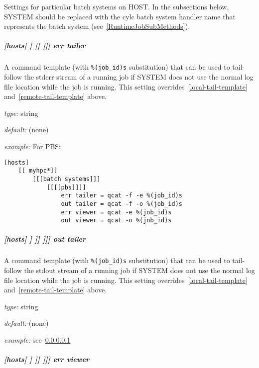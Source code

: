 Settings for particular batch systems on HOST. In the subsections below, SYSTEM
should be replaced with the cylc batch system handler name that represents the
batch system (see~\ref{RuntimeJobSubMethods}).

\subparagraph[{[[[[}SYSTEM{]]]]}err tailer]{[hosts] \textrightarrow [[HOST]] \textrightarrow [[[batch systems]]] \textrightarrow [[[[SYSTEM]]]] \textrightarrow err tailer}
\label{err-tailer}

A command template (with \lstinline=%(job_id)s= substitution) that can be used
to tail-follow the stderr stream of a running job if SYSTEM does
not use the normal log file location while the job is running.  This setting
overrides~\ref{local-tail-template} and~\ref{remote-tail-template} above.

\begin{myitemize}
\item {\em type:} string
\item {\em default:} (none)
\item {\em example:} For PBS:
    \begin{lstlisting}
[hosts]
    [[ myhpc*]]
        [[[batch systems]]]
            [[[[pbs]]]]
                err tailer = qcat -f -e %(job_id)s
                out tailer = qcat -f -o %(job_id)s
                err viewer = qcat -e %(job_id)s
                out viewer = qcat -o %(job_id)s
    \end{lstlisting}
\end{myitemize}

\subparagraph[{[[[[}SYSTEM{]]]]}out tailer]{[hosts] \textrightarrow [[HOST]] \textrightarrow [[[batch systems]]] \textrightarrow [[[[SYSTEM]]]] \textrightarrow out tailer}
\label{out-tailer}

A command template (with \lstinline=%(job_id)s= substitution) that can be used
to tail-follow the stdout stream of a running job if SYSTEM does
not use the normal log file location while the job is running.  This setting
overrides~\ref{local-tail-template} and~\ref{remote-tail-template} above.

\begin{myitemize}
\item {\em type:} string
\item {\em default:} (none)
\item {\em example:} see~\ref{err-tailer}
\end{myitemize}

\subparagraph[{[[[[}SYSTEM{]]]]}err viewer]{[hosts] \textrightarrow [[HOST]] \textrightarrow [[[batch systems]]] \textrightarrow [[[[SYSTEM]]]] \textrightarrow err viewer}

